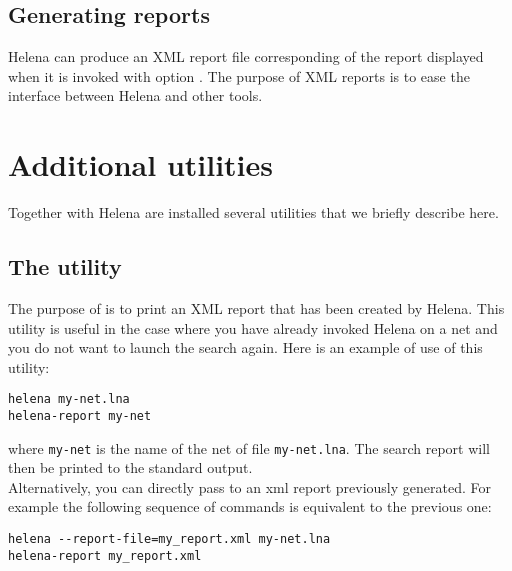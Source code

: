 \subsection{Generating reports}
Helena can produce an XML report file corresponding of the report
displayed when it is invoked with option .  The
purpose of XML reports is to ease the interface between Helena and
other tools.
\section{Additional utilities}
\label{section_utilities}
Together with Helena are installed several utilities that we briefly
describe here.
\subsection{The  utility}
The purpose of  is to print an XML report that
has been created by Helena.  This utility is useful in the case where
you have already invoked Helena on a net and you do not want to launch
the search again.  Here is an example of use of this utility:
\begin{verbatim}
helena my-net.lna
helena-report my-net
\end{verbatim}
where \texttt{my-net} is the name of the net of file \texttt{my-net.lna}.
The search report will then be printed to the standard output.\\
Alternatively, you can directly pass to  an
xml report previously generated.  For example the following sequence
of commands is equivalent to the previous one:
\begin{verbatim}
helena --report-file=my_report.xml my-net.lna
helena-report my_report.xml
\end{verbatim}
